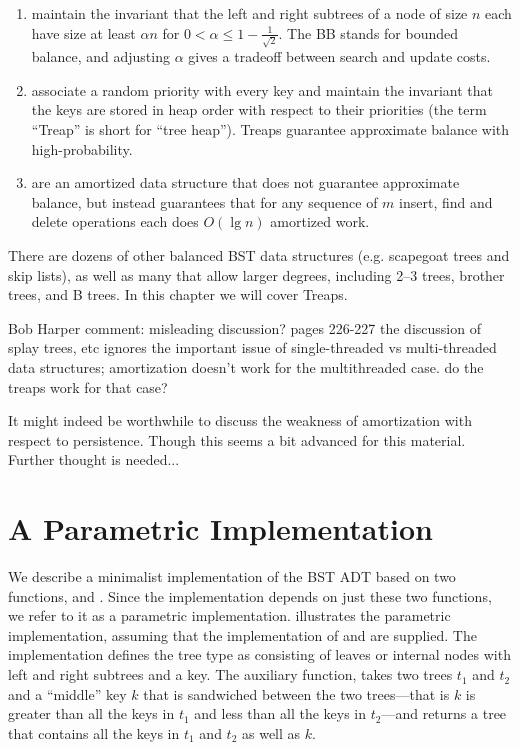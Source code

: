 \begin{chapter}
\begin{enumerate}
\item {} maintain the
  invariant that the left and right subtrees of a node of size $n$
  each have size at least $\alpha n$ for $0 < \alpha \leq
  1 - \frac{1}{\sqrt{2}}$.  The BB stands for bounded balance, and adjusting
  $\alpha$ gives a tradeoff between search and update costs.

\item {} associate a random priority with every key and
  maintain the invariant that the keys are stored in heap order with
  respect to their priorities (the term ``Treap'' is short for ``tree
  heap'').  Treaps guarantee approximate balance with
  high-probability.

\item {} are an amortized data structure that does not
  guarantee approximate balance, but instead guarantees that for any sequence
  of $m$ insert, find and delete operations each does $O(\lg n)$
  amortized work.
\end{enumerate}
There are dozens of other balanced BST data structures (e.g. scapegoat
trees and skip lists), as well as many that allow larger degrees,
including 2--3 trees, brother trees, and B trees.  
%
In this chapter we will cover Treaps.


\begin{todo}

Bob Harper comment:
misleading discussion? pages 226-227 the discussion of splay trees,
etc ignores the important issue of single-threaded vs multi-threaded
data structures; amortization doesn't work for the multithreaded case.
do the treaps work for that case?

It might indeed be worthwhile to discuss the weakness of amortization
with respect to persistence.  Though this seems a bit advanced for
this material.  Further thought is needed...

\end{todo}


\section{A Parametric Implementation}
\label{sec:bst::parametric}

We describe a minimalist implementation of the BST ADT based on two
functions,  and . 
%
Since the implementation depends on just these two functions, we refer
to it as a parametric implementation.
%
 illustrates the parametric implementation,
assuming that the implementation of  and  are
supplied. 
%
The implementation defines the tree type as consisting of
leaves or internal nodes with left and right subtrees and a key.
%
The auxiliary function,  takes two trees $t_1$ and $t_2$
and a ``middle'' key $k$ that is sandwiched between the two
trees---that is $k$ is greater than all the keys in $t_1$ and less
than all the keys in $t_2$---and returns a tree that contains all the
keys in $t_1$ and $t_2$ as well as $k$.


\end{chapter}
